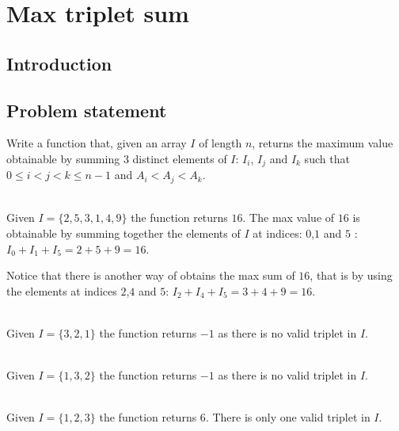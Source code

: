 %



\chapter{Max triplet sum}
\label{ch:max_triplet}
\section*{Introduction}

\section{Problem statement}
\begin{exercise}
\label{example:max_triplet:exercice1}
Write a function that, given an array $I$ of length $n$, returns 
the maximum value obtainable by summing $3$ distinct elements of $I$: $I_i$, $I_j$ and $I_k$ such that
$ 0 \leq i < j < k \leq n-1$ and $ A_i < A_j < A_k $.


	\begin{example}
		\label{example:max_triplet:example1}
		\hfill \\
		Given $I = \{2, 5, 3, 1, 4, 9\}$ the function returns $16$.
		The max value of $16$ is obtainable by summing together the 
		elements of $I$ at indices: $0$,$1$ and $5$ : $I_0 + I_1+I_5=2+5+9= 16$.
		
		Notice that there is another way of obtains the max sum of $16$, that is by using the elements
		at indices $2$,$4$ and $5$: $I_2 + I_4+I_5=3+4+9= 16$.
	\end{example}

	\begin{example}
		\label{example:max_triplet:example2}
		\hfill \\
		Given $I = \{3,2,1\}$ the function returns $-1$ as there is no valid triplet in $I$.		
	\end{example}
	
		\begin{example}
			\hfill \\
			Given $I = \{1,3,2\}$ the function returns $-1$ as there is no valid triplet in $I$.
			\label{ex:max_triplet:example2}	
		\end{example}

	\begin{example}
		\hfill \\
		Given $I = \{1,2,3\}$ the function returns $6$. There is only one valid triplet in $I$.
	\label{ex:max_triplet:example3}
	\end{example}
\end{exercise}

